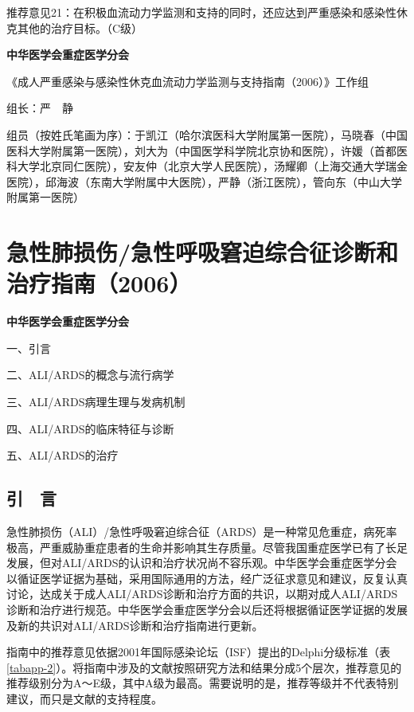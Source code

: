 推荐意见21：在积极血流动力学监测和支持的同时，还应达到严重感染和感染性休克其他的治疗目标。（C级）

\textbf{中华医学会重症医学分会}

《成人严重感染与感染性休克血流动力学监测与支持指南（2006）》工作组

组长：严　静

组员（按姓氏笔画为序）：于凯江（哈尔滨医科大学附属第一医院），马晓春（中国医科大学附属第一医院），刘大为（中国医学科学院北京协和医院），许媛（首都医科大学北京同仁医院），安友仲（北京大学人民医院），汤耀卿（上海交通大学瑞金医院），邱海波（东南大学附属中大医院），严静（浙江医院），管向东（中山大学附属第一医院）

\protect\hypertarget{text00034.html}{}{}

\chapter{急性肺损伤/急性呼吸窘迫综合征诊断和治疗指南（2006）}

\textbf{中华医学会重症医学分会}

一、引言

二、ALI/ARDS的概念与流行病学

三、ALI/ARDS病理生理与发病机制

四、ALI/ARDS的临床特征与诊断

五、ALI/ARDS的治疗

\section{引　言}

急性肺损伤（ALI）/急性呼吸窘迫综合征（ARDS）是一种常见危重症，病死率极高，严重威胁重症患者的生命并影响其生存质量。尽管我国重症医学已有了长足发展，但对ALI/ARDS的认识和治疗状况尚不容乐观。中华医学会重症医学分会以循证医学证据为基础，采用国际通用的方法，经广泛征求意见和建议，反复认真讨论，达成关于成人ALI/ARDS诊断和治疗方面的共识，以期对成人ALI/ARDS诊断和治疗进行规范。中华医学会重症医学分会以后还将根据循证医学证据的发展及新的共识对ALI/ARDS诊断和治疗指南进行更新。

指南中的推荐意见依据2001年国际感染论坛（ISF）提出的Delphi分级标准（表\ref{tabapp-2}）。将指南中涉及的文献按照研究方法和结果分成5个层次，推荐意见的推荐级别分为A～E级，其中A级为最高。需要说明的是，推荐等级并不代表特别建议，而只是文献的支持程度。

